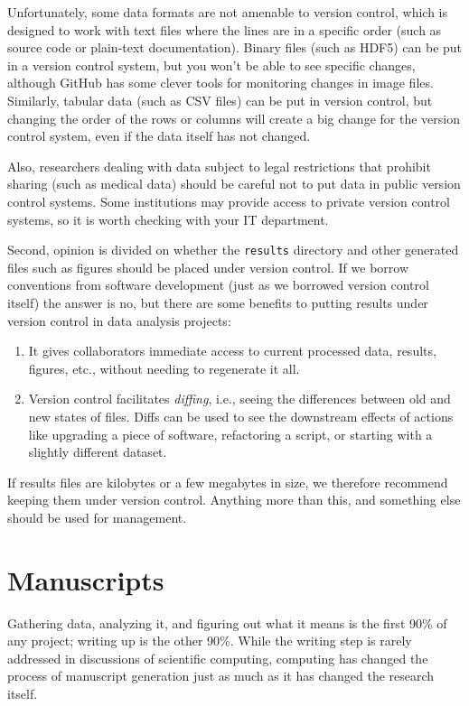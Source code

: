 \documentclass[10pt]{article}
\begin{document}
Unfortunately, some data formats are not amenable to version control,
which is designed to work with text files where the lines are in a
specific order (such as source code or plain-text documentation). Binary
files (such as HDF5) can be put in a version control system, but you
won't be able to see specific changes, although GitHub has some clever
tools for monitoring changes in image files. Similarly, tabular data
(such as CSV files) can be put in version control, but changing the
order of the rows or columns will create a big change for the version
control system, even if the data itself has not changed.

Also, researchers dealing with data subject to legal restrictions that
prohibit sharing (such as medical data) should be careful not to put
data in public version control systems. Some institutions may provide
access to private version control systems, so it is worth checking with
your IT department.

Second, opinion is divided on whether the \texttt{results} directory and
other generated files such as figures should be placed under version
control. If we borrow conventions from software development (just as we
borrowed version control itself) the answer is no, but there are some
benefits to putting results under version control in data analysis
projects:

\begin{enumerate}
\item
  It gives collaborators immediate access to current processed data,
  results, figures, etc., without needing to regenerate it all.
\item
  Version control facilitates \emph{diffing}, i.e., seeing the
  differences between old and new states of files. Diffs can be used to
  see the downstream effects of actions like upgrading a piece of
  software, refactoring a script, or starting with a slightly different
  dataset.
\end{enumerate}

If results files are kilobytes or a few megabytes in size, we therefore
recommend keeping them under version control. Anything more than this,
and something else should be used for management.

\section{Manuscripts}\label{manuscripts}

Gathering data, analyzing it, and figuring out what it means is the
first 90\% of any project; writing up is the other 90\%. While the
writing step is rarely addressed in discussions of scientific computing,
computing has changed the process of manuscript generation just as much
as it has changed the research itself.
\end{document}
